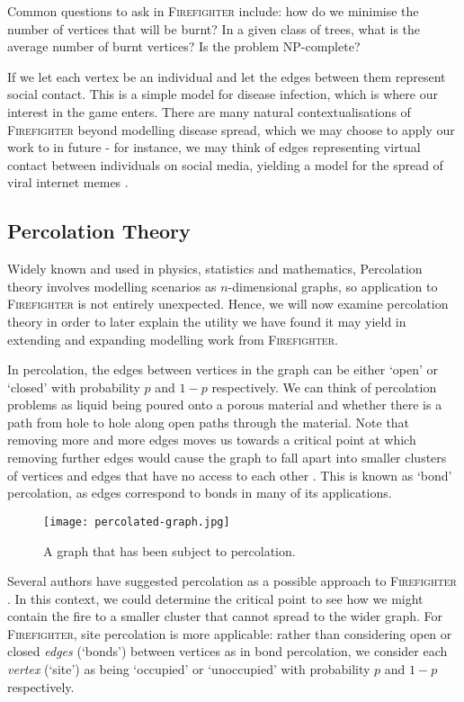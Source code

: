 \documentclass[../report.tex]{subfiles}
\begin{document}
Common questions to ask in {\scshape Firefighter} include: how do we minimise the number of vertices that will be burnt? In a given class of trees, what is the average number of burnt vertices? Is the problem NP-complete?

If we let each vertex be an individual and let the edges between them represent social contact. This is a simple model for disease infection, which is where our interest in the game enters. There are many natural contextualisations of {\scshape Firefighter} beyond modelling disease spread, which we may choose to apply our work to in future - for instance, we may think of edges representing virtual contact between individuals on social media, yielding a model for the spread of viral internet memes \cite{obrien_2019}.

\subsection{Percolation Theory}
\label{sec:perc}

Widely known and used in physics, statistics and mathematics, Percolation theory involves modelling scenarios as $n$-dimensional graphs, so application to {\scshape Firefighter} is not entirely unexpected. Hence, we will now examine percolation theory in order to later explain the utility we have found it may yield in extending and expanding modelling work from {\scshape Firefighter}.

In percolation, the edges between vertices in the graph can be either `open' or `closed' with probability $p$ and $1-p$ respectively. We can think of percolation problems as liquid being poured onto a porous material and whether there is a path from hole to hole along open paths through the material. Note that removing more and more edges moves us towards a critical point at which removing further edges would cause the graph to fall apart into smaller clusters of vertices and edges that have no access to each other \cite{grimmett_1999}. This is known as `bond' percolation, as edges correspond to bonds in many of its applications.
\begin{figure}[ht]
	\centering
		\texttt{[image: percolated-graph.jpg]}
	\caption{A graph that has been subject to percolation.}
	\label{fig:percolated-graph}
\end{figure}

Several authors have suggested percolation as a possible approach to {\scshape Firefighter} \cite{finbow_2009}. In this context, we could determine the critical point to see how we might contain the fire to a smaller cluster that cannot spread to the wider graph. For {\scshape Firefighter}, site percolation is more applicable: rather than considering open or closed \emph{edges} (`bonds') between vertices as in bond percolation, we consider each \emph{vertex} (`site') as being `occupied' or `unoccupied' with probability $p$ and $1-p$ respectively.
\end{document}
